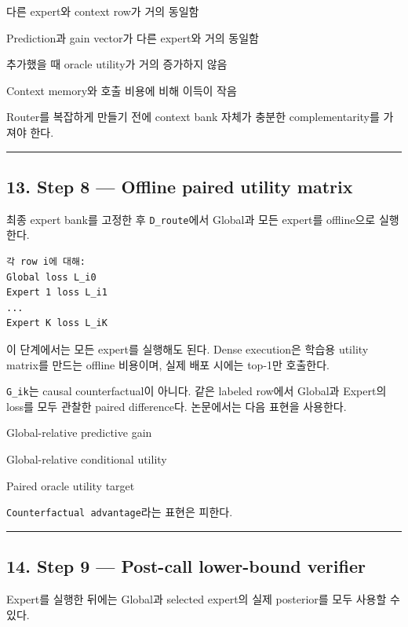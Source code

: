 \par\noindent \textbullet\enspace 다른 expert와 context row가 거의 동일함


\par\noindent \textbullet\enspace Prediction과 gain vector가 다른 expert와 거의 동일함


\par\noindent \textbullet\enspace 추가했을 때 oracle utility가 거의 증가하지 않음


\par\noindent \textbullet\enspace Context memory와 호출 비용에 비해 이득이 작음


Router를 복잡하게 만들기 전에 context bank 자체가 충분한 complementarity를 가져야 한다.


\medskip\hrule\medskip
\subsection{13. Step 8 — Offline paired utility matrix}
최종 expert bank를 고정한 후 \texttt{D\_\allowbreak{}\allowbreak{}route}에서 Global과 모든 expert를 offline으로 실행한다.


\begin{Verbatim}[breaklines=true,breakanywhere=true,fontsize=\scriptsize]
각 row i에 대해:
Global loss L_i0
Expert 1 loss L_i1
...
Expert K loss L_iK

\end{Verbatim}
이 단계에서는 모든 expert를 실행해도 된다. Dense execution은 학습용 utility matrix를 만드는 offline 비용이며, 실제 배포 시에는 top-1만 호출한다.

\texttt{G\_\allowbreak{}\allowbreak{}ik}는 causal counterfactual이 아니다. 같은 labeled row에서 Global과 Expert의 loss를 모두 관찰한 paired difference다. 논문에서는 다음 표현을 사용한다.

\par\noindent \textbullet\enspace Global-relative predictive gain


\par\noindent \textbullet\enspace Global-relative conditional utility


\par\noindent \textbullet\enspace Paired oracle utility target


\texttt{Counterf\allowbreak{}actual a\allowbreak{}dvantage\allowbreak{}}라는 표현은 피한다.


\medskip\hrule\medskip
\subsection{14. Step 9 — Post-call lower-bound verifier}
Expert를 실행한 뒤에는 Global과 selected expert의 실제 posterior를 모두 사용할 수 있다.

